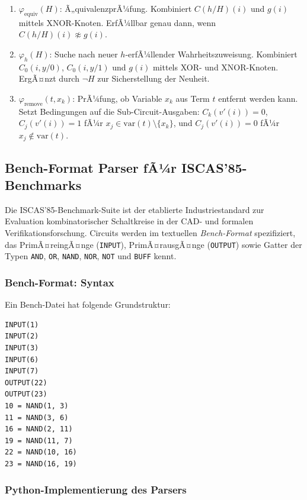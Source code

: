 ﻿\documentclass[a4paper,12pt]{article}
\theoremstyle{definition}
\begin{document}
\begin{enumerate}
    \item \textbf{$\varphi_{\text{equiv}}(H)$}: Ã„quivalenzprÃ¼fung. Kombiniert $C(h/H)(i)$ und $g(i)$ mittels XNOR-Knoten. ErfÃ¼llbar genau dann, wenn $C(h/H)(i) \not\approx g(i)$.
    
    \item \textbf{$\varphi_h(H)$}: Suche nach neuer $h$-erfÃ¼llender Wahrheitszuweisung. Kombiniert $C_0(i, y/0)$, $C_0(i, y/1)$ und $g(i)$ mittels XOR- und XNOR-Knoten. ErgÃ¤nzt durch $\neg H$ zur Sicherstellung der Neuheit.
    
    \item \textbf{$\varphi_{\text{remove}}(t, x_k)$}: PrÃ¼fung, ob Variable $x_k$ aus Term $t$ entfernt werden kann. Setzt Bedingungen auf die Sub-Circuit-Ausgaben: $C_k(v'(i)) = 0$, $C_j(v'(i)) = 1$ fÃ¼r $x_j \in \text{var}(t) \setminus \{x_k\}$, und $C_j(v'(i)) = 0$ fÃ¼r $x_j \notin \text{var}(t)$.
\end{enumerate}

\subsection{Bench-Format Parser fÃ¼r ISCAS'85-Benchmarks}
\label{subsec:bench-parser}

Die ISCAS'85-Benchmark-Suite \cite{Brglez85} ist der etablierte Industriestandard
zur Evaluation kombinatorischer Schaltkreise in der CAD- und formalen
Verifikationsforschung.  Circuits werden im textuellen \emph{Bench-Format}
spezifiziert, das PrimÃ¤reingÃ¤nge (\texttt{INPUT}), PrimÃ¤rausgÃ¤nge
(\texttt{OUTPUT}) sowie Gatter der Typen \texttt{AND}, \texttt{OR},
\texttt{NAND}, \texttt{NOR}, \texttt{NOT} und \texttt{BUFF} kennt.

\subsubsection{Bench-Format: Syntax}

Ein Bench-Datei hat folgende Grundstruktur:
\begin{lstlisting}[language={},caption={Bench-Format -- Minimalbeispiel (c17)}]
INPUT(1)
INPUT(2)
INPUT(3)
INPUT(6)
INPUT(7)
OUTPUT(22)
OUTPUT(23)
10 = NAND(1, 3)
11 = NAND(3, 6)
16 = NAND(2, 11)
19 = NAND(11, 7)
22 = NAND(10, 16)
23 = NAND(16, 19)
\end{lstlisting}

\subsubsection{Python-Implementierung des Parsers}
\end{document}
